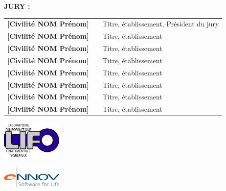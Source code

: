 {\begin{sffamily}
\textsc{\textbf{JURY : }}\vspace*{2mm}\\
\begin{tabular}{l p{2cm} p{8cm}}
\textbf{[Civilité NOM Prénom]} &  & Titre, établissement, Président du jury\\
\textbf{[Civilité NOM Prénom]} &  & Titre, établissement\\
\textbf{[Civilité NOM Prénom]} &  & Titre, établissement\\
\textbf{[Civilité NOM Prénom]} &  & Titre, établissement\\
\textbf{[Civilité NOM Prénom]} &  & Titre, établissement\\
\textbf{[Civilité NOM Prénom]} &  & Titre, établissement\\
\textbf{[Civilité NOM Prénom]} &  & Titre, établissement\\
\textbf{[Civilité NOM Prénom]} &  & Titre, établissement\\
\end{tabular}

\vspace{0.8cm}

\begin{minipage}{3cm}
\includegraphics[width=3cm]{logos/logoLIFO.png} 
\end{minipage}
\hfill
\begin{minipage}{3cm}
\includegraphics[width=3cm]{logos/logoEnnov.png} 
\end{minipage}
\hfill

\end{sffamily}
}	 
\setlength{\voffset}{0pt}
